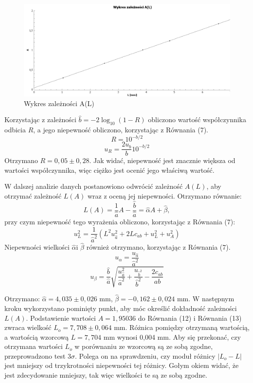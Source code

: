 \documentclass[10pt,a4paper]{article}
\begin{document}
\begin{figure}[h!]
\includegraphics[width=15cm]{rap7rys1} 
\centering
\caption{Wykres zależności A(L)}
\end{figure}

Korzystając z zależności $\hat{b}=-2\log_{10}(1-R)$ obliczono wartość współczynnika odbicia $R$, a jego niepewność obliczono, korzystając z Równania (7). 
\[R=10^{{-b}/{2}}\]
\[u_{R}=\dfrac{2u_{b}}{b} 10^{{-b}/{2}}\]
Otrzymano $R=0,05\pm0,28$. Jak widać, niepewność jest znacznie większa od wartości współczynnika, więc ciężko jest ocenić jego właściwą wartość.


W dalszej analizie danych postanowiono odwrócić zależność $A(L)$, aby otrzymać zależność $L(A)$ wraz z oceną jej niepewności. Otrzymano równanie:
\begin{equation}
L(A)=\dfrac{1}{\hat{a}}A-\dfrac{\hat{b}}{\hat{a}}=\hat{\alpha}A+\hat{\beta},
\end{equation}
przy czym niepewność tego wyrażenia obliczono, korzystając z Równania (7):
\begin{equation}
u_{L}^2=\dfrac{1}{\hat{a}^2}\left(L^{2}u_{\hat{a}}^{2}+2Lc_{ab}+u_{L}^{2}+u_{A}^{2}\right)
\end{equation}
Niepewności wielkości $\hat{\alpha}$i $\hat{\beta}$ również otrzymano, korzystając z Równania (7).
\[u_{\alpha}=\dfrac{u_{\hat{a}}}{\hat{a}^2} \] 
\[ u_{\beta}=\dfrac{\hat{b}}{\hat{a}}\sqrt{\dfrac{u_{\hat{a}}^2}{\hat{a}^2}+\dfrac{u_{\hat{b}^2}}{\hat{b}^2}-\dfrac{2c_{ab}}{ab}}\]

 Otrzymano: $\hat{\alpha}=4,035\pm0,026$ mm, $\hat{\beta}=-0,162\pm0,024$ mm. W następnym kroku wykorzystano pominięty punkt, aby móc określić dokładność zależności $L(A)$. Podstawienie wartości $A=1,95036$ do Równania (12) i Równania (13) zwraca wielkość $L_{o}=7,708\pm0,064$ mm. Różnica pomiędzy otrzymaną wartością, a wartością wzorcową $L=7,704$ mm wynosi 0,004 mm. Aby się przekonać, czy otrzymana wartości $L_{o}$ w porównaniu ze wzorcową są ze sobą zgodne, przeprowadzono test $3\sigma$. Polega on na sprawdzeniu, czy moduł różnicy $|L_{o}-L|$ jest mniejszy od trzykrotności niepewności tej różnicy. Gołym okiem widać, że jest zdecydowanie mniejszy, tak więc wielkości te są ze sobą zgodne.
 
\end{document}
